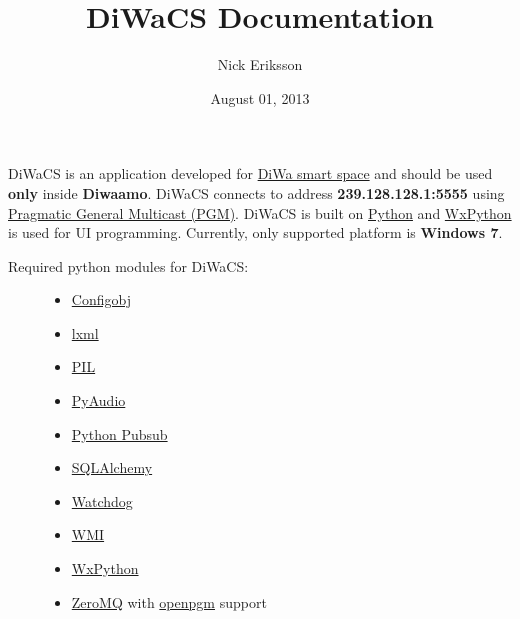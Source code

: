 \documentclass[letterpaper,10pt,english]{sphinxmanual}
\title{DiWaCS Documentation}
\date{August 01, 2013}
\author{Nick Eriksson}
\begin{document}
\maketitle
\tableofcontents
{}\label{index::doc}


DiWaCS is an application developed for \href{https://cse.aalto.fi/research/groups/stratus/research/research-projects/}{DiWa smart space}
and should be used \textbf{only} inside \textbf{Diwaamo}.
DiWaCS connects to address \textbf{239.128.128.1:5555} using \href{http://code.google.com/p/openpgm/}{Pragmatic General Multicast (PGM)}.
DiWaCS is built on \href{http://www.python.org}{Python} and \href{http://www.wxpython.org}{WxPython} is used for UI programming.
Currently, only supported platform is \textbf{Windows 7}.
\begin{description}
\item[{Required python modules for DiWaCS:}] \leavevmode\begin{itemize}
\item {} 
\href{http://www.voidspace.org.uk/python/configobj.html}{Configobj}

\item {} 
\href{http://pypi.python.org/pypi/lxml/}{lxml}

\item {} 
\href{http://www.pythonware.com/products/pil/}{PIL}

\item {} 
\href{http://pypi.python.org/pypi/PyAudio}{PyAudio}

\item {} 
\href{http://pubsub.sourceforge.net/}{Python Pubsub}

\item {} 
\href{http://www.sqlalchemy.org/}{SQLAlchemy}

\item {} 
\href{http://packages.python.org/watchdog/}{Watchdog}

\item {} 
\href{http://pypi.python.org/pypi/WMI/1.4.9/}{WMI}

\item {} 
\href{http://www.wxpython.org}{WxPython}

\item {} 
\href{http://zeromq.org}{ZeroMQ} with \href{http://code.google.com/p/openpgm/}{openpgm} support

\end{itemize}

\end{description}
\end{document}

